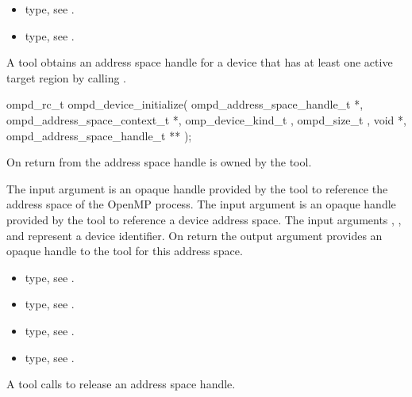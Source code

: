 \crossreferences
\begin{itemize}
	\item {} type, see 
	.
	\item {} type, see 
	.
\end{itemize}


\label{ompd:ompd_device_initialize}
\summary
A tool obtains an address space handle for a device that has
at least one active target region by calling
.

\format

\cspecificstart
\begin{ompSyntax}
ompd_rc_t ompd_device_initialize(
  ompd_address_space_handle_t *,
  ompd_address_space_context_t *,
  omp_device_kind_t  ,
  ompd_size_t  ,
  void *,
  ompd_address_space_handle_t **
);
\end{ompSyntax}
\cspecificend


\descr
On return from  the address
space handle is owned by the tool.

\argdesc

The input argument  is an opaque handle provided by the tool
to reference the address space of the OpenMP process.
The input argument  is an opaque handle provided by the tool
to reference a device address space.
The input arguments ,  , and  represent a device identifier. 
On return the output argument  provides an opaque handle to the
tool for this address space.

\crossreferences
\begin{itemize}
	\item {} type, see 
	.
	\item {} type, see .
	\item {} type, see .
	\item {} type, see 
	.
\end{itemize}


\label{ompd:ompd_release_address_space_handle}
\summary
A tool calls  to release an address space 
handle.

